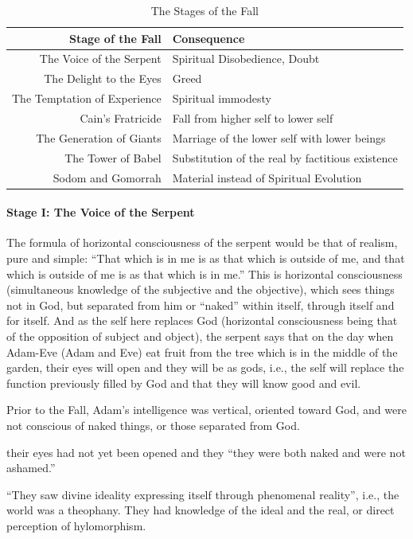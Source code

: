 \begin{table}[h]\small
\begin{tabular}{rl}\toprule
\textbf{Stage of the Fall} &
\textbf{Consequence}\\\midrule
The Voice of the Serpent &
Spiritual Disobedience, Doubt\\
The Delight to the Eyes &
Greed\\
The Temptation of Experience &
Spiritual immodesty\\
Cain's Fratricide &
Fall from higher self to lower self\\
The Generation of Giants &
Marriage of the lower self with lower beings\\
The Tower of Babel &
Substitution of the real by factitious existence\\
Sodom and Gomorrah &
Material instead of Spiritual Evolution\\\bottomrule
\end{tabular}
\caption{The Stages of the Fall}\label{tab:TheStFall2018}
\end{table}

\paragraph{Stage I: The Voice of the Serpent}
\begin{quotex}
The formula of horizontal consciousness of the serpent would be that of realism, pure and simple: “That which is in me
is as that which is outside of me, and that which is outside of me is as that which is in me.” This is horizontal
consciousness (simultaneous knowledge of the subjective and the objective), which sees things not in God, but separated
from him or “naked” within itself, through itself and for itself. And as the self here replaces God (horizontal
consciousness being that of the opposition of subject and object), the serpent says that on the day when Adam-Eve (Adam
and Eve) eat fruit from the tree which is in the middle of the garden, their eyes will open and they will be as gods,
i.e., the self will replace the function previously filled by God and that they will know good and evil.  

\end{quotex}
Prior to the Fall, Adam's intelligence was vertical, oriented toward God, and were not conscious of naked
things, or those separated from God.

\begin{quotex}
their eyes had not yet been opened and they “they were both naked and were not ashamed.” 

\end{quotex}
“They saw divine ideality expressing itself through phenomenal reality”, i.e., the world was a theophany. They had
knowledge of the ideal and the real, or direct perception of hylomorphism.

